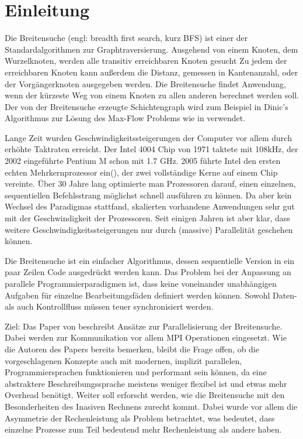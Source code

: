 \chapter{Einleitung}
\label{ch:einleitung}

Die Breitensuche (engl: breadth first search, kurz BFS) ist einer der Standardalgorithmen zur Graphtraversierung. Ausgehend von einem Knoten, dem Wurzelknoten, werden alle transitiv erreichbaren Knoten gesucht Zu jedem der erreichbaren Knoten kann außerdem die Distanz, gemessen in Kantenanzahl, oder der Vorgängerknoten ausgegeben werden. Die Breitensuche findet Anwendung, wenn der kürzeste Weg von einem Knoten zu allen anderen berechnet werden soll. Der von der Breitensuche erzeugte Schichtengraph wird zum Beispiel in Dinic's Algorithmus zur Lösung des Max-Flow Problems wie in \cite{Dinitz:2006} verwendet. 

Lange Zeit wurden Geschwindigkeitssteigerungen der Computer vor allem durch erhöhte Taktraten erreicht. Der Intel 4004 Chip von 1971 taktete mit 108kHz, der 2002 eingeführte Pentium M schon mit 1.7 GHz. 2005 führte Intel den ersten echten Mehrkernprozessor ein(\cite{Intel:2006:Online}), der zwei vollständige Kerne auf einem Chip vereinte. Über 30 Jahre lang optimierte man Prozessoren darauf, einen einzelnen, sequentiellen Befehlsstrang möglichst schnell ausführen zu können. Da aber kein Wechsel des Paradigmas stattfand, skalierten vorhandene Anwendungen sehr gut mit der Geschwindigkeit der Prozessoren. Seit einigen Jahren ist aber klar, dass weitere Geschwindigkeitssteigerungen nur durch (massive) Parallelität geschehen können.  

Die Breitensuche ist ein einfacher Algorithmus, dessen sequentielle Version in ein paar Zeilen Code ausgedrückt werden kann. Das Problem bei der Anpassung an parallele Programmierparadigmen ist, dass keine voneinander unabhängigen Aufgaben für einzelne Bearbeitungsfäden definiert werden können. Sowohl Daten- als auch Kontrollfluss müssen teuer synchronisiert werden.


Ziel:
Das Paper von \cite{Buluc:2011} beschreibt Ansätze zur Parallelisierung der Breitensuche. Dabei werden zur Kommunikation vor allem MPI Operationen eingesetzt. Wie die Autoren des Papers bereits bemerken, bleibt die Frage offen, ob die vorgeschlagenen Konzepte auch mit modernen, implizit parallelen, Programmiersprachen funktionieren und performant sein können, da eine abstraktere Beschreibungssprache meistens weniger flexibel ist und etwas mehr Overhead benötigt. Weiter soll erforscht werden, wie die Breitensuche mit den Besonderheiten des Inasiven Rechnens zurecht kommt. Dabei wurde vor allem die Asymmetrie der Rechenleistung als Problem betrachtet, was bedeutet, dass einzelne Prozesse zum Teil bedeutend mehr Rechenleistung als andere haben.